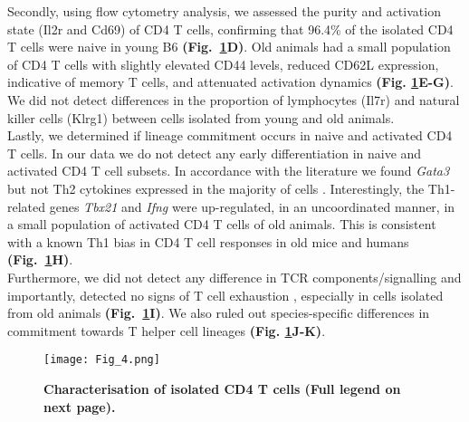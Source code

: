 Secondly, using flow cytometry analysis, we assessed the purity and activation state (Il2r\textalpha{} and Cd69) of CD4\plus{} T cells, confirming that 96.4\% of the isolated CD4\plus{} T cells were naive in young B6 \textbf{(Fig.~\ref{fig1:characterization}D)}. 
Old animals had a small population of CD4\plus{} T cells with slightly elevated CD44 levels, reduced CD62L expression, indicative of memory T cells, and attenuated activation dynamics \textbf{(Fig. \ref{fig1:characterization}E-G)}. 
We did not detect differences in the proportion of lymphocytes (\gls{Il7r}) and natural killer cells (\gls{Klrg1}) between cells isolated from young and old animals. \\

Lastly, we determined if lineage commitment occurs in naive and activated CD4\plus{} T cells. 
In our data we do not detect any early differentiation in naive and activated CD4\plus{} T cell subsets. 
In accordance with the literature we found \textit{Gata3} but not Th2 cytokines expressed in the majority of cells  \citep{Ho2009}. Interestingly, the Th1-related genes \textit{Tbx21} and \textit{Ifng} were up-regulated, in an uncoordinated manner, in a small population of activated CD4\plus{} T cells of old animals. 
This is consistent with a known Th1 bias in CD4\plus{} T cell responses in old mice \citep{Zhang2014} and humans \citep{Sakata-Kaneko2000} \textbf{(Fig.~\ref{fig1:characterization}H)}. \\

Furthermore, we did not detect any difference in TCR components/signalling and importantly, detected no signs of T cell exhaustion \citep{Wherry2011}, especially in cells isolated from old animals \textbf{(Fig.~\ref{fig1:characterization}I)}. 
We also ruled out species-specific differences in commitment towards T helper cell lineages \textbf{(Fig. \ref{fig1:characterization}J-K)}. 

\begin{figure}[!hb]
\centering
\texttt{[image: Fig\_4.png]}
\caption[Characterisation of isolated CD4\plus{} T cells]{\textbf{Characterisation of isolated CD4\plus{} T cells (Full legend on next page).}}
\label{fig1:characterization}
\end{figure}

